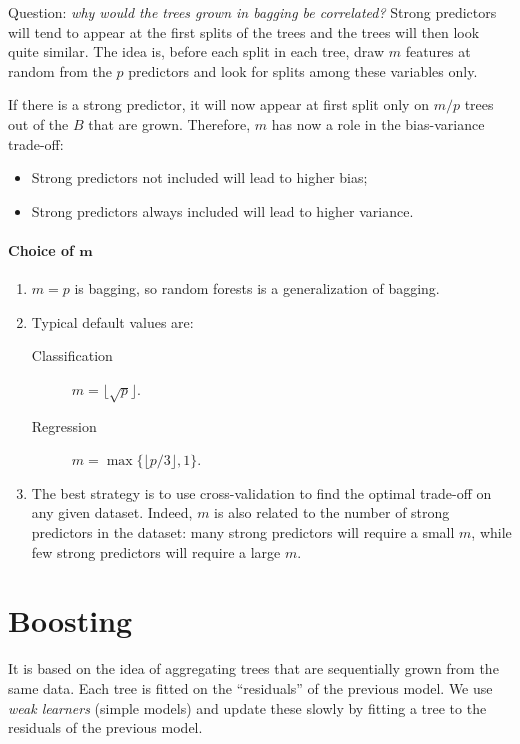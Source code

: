 Question: \emph{why would the trees grown in bagging be correlated?} Strong predictors will tend to appear at the first splits of the trees and the trees will then look quite similar. The idea is, before each split in each tree, draw $m$ features at random from the $p$ predictors and look for splits among these variables only.

If there is a strong predictor, it will now appear at first split only on $m/p$ trees out of the $B$ that are grown. Therefore, $m$ has now a role in the bias-variance trade-off: 
\begin{itemize}
    \item Strong predictors not included will lead to higher bias;
    \item Strong predictors always included will lead to higher variance.
\end{itemize}

\paragraph{Choice of $\bm{m}$}

\begin{enumerate}
    \item $m = p$ is bagging, so random forests is a generalization of bagging.
    \item Typical default values are:
    \begin{description}
        \item[Classification] $m = \lfloor\sqrt{p}\rfloor$.
        \item[Regression] $m = \max\{\lfloor p/3 \rfloor, 1\}$.
    \end{description}
    \item The best strategy is to use cross-validation to find the optimal trade-off on any given dataset. Indeed, $m$ is also related to the number of strong predictors in the dataset: many strong predictors will require a small $m$, while few strong predictors will require a large $m$.
\end{enumerate}

\section{Boosting}

It is based on the idea of aggregating trees that are sequentially grown from the same data. Each tree is fitted on the ``residuals'' of the previous model. We use \emph{weak learners} (simple models) and update these slowly by fitting a tree to the residuals of the previous model.

